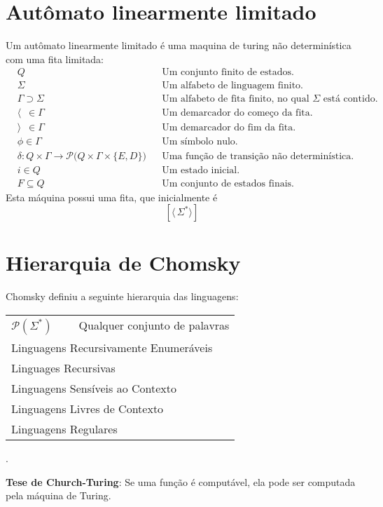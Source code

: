 \documentclass[11pt]{article}
\begin{document}
\section{Autômato linearmente limitado}
\label{sec:org0e844d6}
Um autômato linearmente limitado é uma maquina de turing não determinística com uma fita
limitada:
\begin{align*}
  & Q && \text{Um conjunto finito de estados.} \\
  & \Sigma && \text{Um alfabeto de linguagem finito.} \\
  & \Gamma \supset \Sigma && \text{Um alfabeto de fita finito, no qual $\Sigma$ está contido.} \\
  & \langle \enspace \in \Gamma && \text{Um demarcador do começo da fita.} \\
  & \rangle \enspace \in \Gamma && \text{Um demarcador do fim da fita.} \\
  & \phi \in \Gamma && \text{Um símbolo nulo.} \\
  & \delta: Q \times \Gamma \to \mathcal{P}\big(Q \times \Gamma \times \{E, D\}\big) && \text{Uma função de transição não determinística.} \\
  & i \in Q && \text{Um estado inicial.} \\
  & F \subseteq Q && \text{Um conjunto de estados finais.}
\end{align*}
Esta máquina possui uma fita, que inicialmente é
\[
  \left[\langle\,\Sigma^* \rangle\right]
\]
\section{Hierarquia de Chomsky}
\label{sec:orgd7aa461}
Chomsky definiu a seguinte hierarquia das linguagens:
\begin{table}[H]
  \centering
  \left\downarrow
  \begin{tabular}{l}
    $\mathcal{P}(\Sigma^*) \qquad$ Qualquer conjunto de palavras \\
    Linguagens Recursivamente Enumeráveis \\
    Linguages Recursivas \\
    Linguagens Sensíveis ao Contexto \\
    Linguagens Livres de Contexto \\
    Linguagens Regulares
  \end{tabular}
  \right.
\end{table}
\textbf{Tese de Church-Turing}: Se uma função é computável, ela pode ser computada pela máquina
de Turing.
\end{document}
